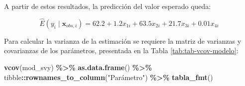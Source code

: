 \documentclass[
  spanish,
  12pt,
]{book}
\newenvironment{Shaded}{\begin{snugshade}}{\end{snugshade}}
\newcommand{\FunctionTok}[1]{\textcolor[rgb]{0.13,0.29,0.53}{\textbf{#1}}}
\newcommand{\NormalTok}[1]{#1}
\newcommand{\SpecialCharTok}[1]{\textcolor[rgb]{0.81,0.36,0.00}{\textbf{#1}}}
\newcommand{\StringTok}[1]{\textcolor[rgb]{0.31,0.60,0.02}{#1}}
\begin{document}
A partir de estos resultados, la predicción del valor esperado queda:

\[
\hat{E}(y_{i}\mid\boldsymbol{x}_{obs,i})=62.2+1.2x_{1i}+63.5x_{2i}+21.7x_{3i}+0.01x_{4i}
\]

Para calcular la varianza de la estimación se requiere la matriz de varianzas y covarianzas de los parámetros, presentada en la Tabla \ref{tab:tab-vcov-modelo}:

\begin{Shaded}
\begin{Highlighting}[]
\FunctionTok{vcov}\NormalTok{(mod\_svy) }\SpecialCharTok{\%\textgreater{}\%}
  \FunctionTok{as.data.frame}\NormalTok{() }\SpecialCharTok{\%\textgreater{}\%}
\NormalTok{  tibble}\SpecialCharTok{::}\FunctionTok{rownames\_to\_column}\NormalTok{(}\StringTok{"Parámetro"}\NormalTok{) }\SpecialCharTok{\%\textgreater{}\%}
  \FunctionTok{tabla\_fmt}\NormalTok{()}
\end{Highlighting}
\end{Shaded}
\end{document}
